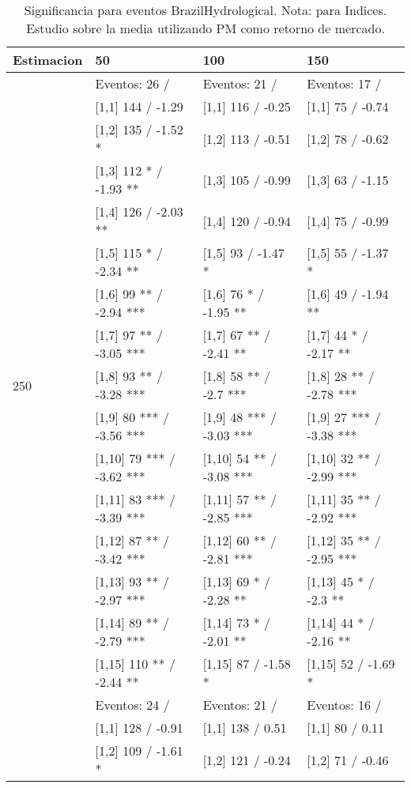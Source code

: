 \begin{table}

\caption{Significancia para eventos BrazilHydrological. Nota: para Indices. Estudio sobre la media utilizando PM como retorno de mercado.}
\centering
\begin{tabular}[t]{llll}
\toprule
Estimacion & 50 & 100 & 150\\
\midrule
 & Eventos:  26 / & Eventos:  21 / & Eventos:  17 /\\
 & {}[1,1] 144  / -1.29 & {}[1,1] 116  / -0.25 & {}[1,1] 75  / -0.74\\
 & {}[1,2] 135  / -1.52 * & {}[1,2] 113  / -0.51 & {}[1,2] 78  / -0.62\\
 & {}[1,3] 112 * / -1.93 ** & {}[1,3] 105  / -0.99 & {}[1,3] 63  / -1.15\\
 & {}[1,4] 126  / -2.03 ** & {}[1,4] 120  / -0.94 & {}[1,4] 75  / -0.99\\
\addlinespace
 & {}[1,5] 115 * / -2.34 ** & {}[1,5] 93  / -1.47 * & {}[1,5] 55  / -1.37 *\\
 & {}[1,6] 99 ** / -2.94 *** & {}[1,6] 76 * / -1.95 ** & {}[1,6] 49  / -1.94 **\\
 & {}[1,7] 97 ** / -3.05 *** & {}[1,7] 67 ** / -2.41 ** & {}[1,7] 44 * / -2.17 **\\
250 & {}[1,8] 93 ** / -3.28 *** & {}[1,8] 58 ** / -2.7 *** & {}[1,8] 28 ** / -2.78 ***\\
 & {}[1,9] 80 *** / -3.56 *** & {}[1,9] 48 *** / -3.03 *** & {}[1,9] 27 *** / -3.38 ***\\
\addlinespace
 & {}[1,10] 79 *** / -3.62 *** & {}[1,10] 54 ** / -3.08 *** & {}[1,10] 32 ** / -2.99 ***\\
 & {}[1,11] 83 *** / -3.39 *** & {}[1,11] 57 ** / -2.85 *** & {}[1,11] 35 ** / -2.92 ***\\
 & {}[1,12] 87 ** / -3.42 *** & {}[1,12] 60 ** / -2.81 *** & {}[1,12] 35 ** / -2.95 ***\\
 & {}[1,13] 93 ** / -2.97 *** & {}[1,13] 69 * / -2.28 ** & {}[1,13] 45 * / -2.3 **\\
 & {}[1,14] 89 ** / -2.79 *** & {}[1,14] 73 * / -2.01 ** & {}[1,14] 44 * / -2.16 **\\
\addlinespace
 & {}[1,15] 110 ** / -2.44 ** & {}[1,15] 87  / -1.58 * & {}[1,15] 52  / -1.69 *\\
 & Eventos:  24 / & Eventos:  21 / & Eventos:  16 /\\
 & {}[1,1] 128  / -0.91 & {}[1,1] 138  / 0.51 & {}[1,1] 80  / 0.11\\
 & {}[1,2] 109  / -1.61 * & {}[1,2] 121  / -0.24 & {}[1,2] 71  / -0.46\\

\end{tabular}
\end{table}
